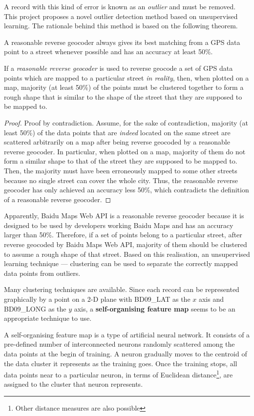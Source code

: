 A record with this kind of error is known as an \emph{outlier} and must be removed. This project proposes a novel outlier detection method based on unsupervised learning. The rationale behind this method is based on the following theorem.

\begin{defn}
A reasonable reverse geocoder always gives its best matching from a GPS data point to a street whenever possible and has an accuracy at least 50\%.
\end{defn}

\begin{theorem}
If a \emph{reasonable reverse geocoder} is used to reverse geocode a set of GPS data points which are mapped to a particular street \emph{in reality}, then, when plotted on a map, majority (at least 50\%) of the points must be clustered together to form a rough shape that is similar to the shape of the street that they are supposed to be mapped to. 
\end{theorem}

\begin{proof}
Proof by contradiction. Assume, for the sake of contradiction, majority (at least 50\%) of the data points that are \emph{indeed} located on the same street are scattered arbitrarily on a map after being reverse geocoded by a reasonable reverse geocoder. In particular, when plotted on a map, majority of them do not form a similar shape to that of the street they are supposed to be mapped to. Then, the majority must have been erroneously mapped to some other streets because no single street can cover the whole city. Thus, the reasonable reverse geocoder has only achieved an accuracy less 50\%, which contradicts the definition of a reasonable reverse geocoder. 
\end{proof}

Apparently, Baidu Maps Web API is a reasonable reverse geocoder because it is designed to be used by developers working Baidu Maps and has an accuracy larger than 50\%. Therefore, if a set of points belong to a particular street, after reverse geocoded by Baidu Maps Web API, majority of them should be clustered to assume a rough shape of that street. Based on this realisation, an unsupervised learning technique --- clustering can be used to separate the correctly mapped data points from outliers. 

Many clustering techniques are available. Since each record can be represented graphically by a point on a 2-D plane with BD09\_LAT as the $x$ axis and BD09\_LONG as the $y$ axis, a \textbf{self-organising feature map}\cite{TK82} seems to be an appropriate technique to use. 

A self-organising feature map is a type of artificial neural network. It consists of a pre-defined number of interconnected neurons randomly scattered among the data points at the begin of training. A neuron gradually moves to the centroid of the data cluster it represents as the training goes. Once the training stops, all data points near to a particular neuron, in terms of Euclidean distance\footnote{Other distance measures are also possible}, are assigned to the cluster that neuron represents. 